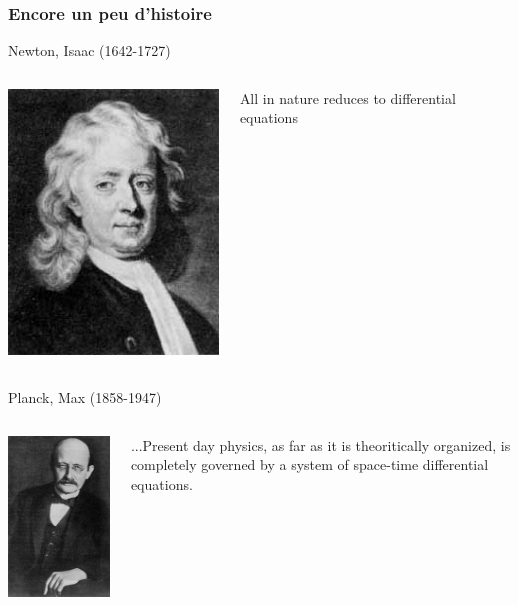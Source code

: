 \begin{frame}
  \frametitle{Encore un peu d'histoire}

  \begin{block}{Newton, Isaac (1642-1727) }
    \begin{columns}[c]
      \begin{column}{.3\textwidth}
        \includegraphics[height=.25\textheight]{Figures/photos/Newton}
      \end{column}
      \begin{column}{.55\textwidth}
        All in nature reduces to differential equations
      \end{column}
    \end{columns}

  \end{block}

  \begin{block}{Planck, Max (1858-1947)}
    \begin{columns}[c]
      \begin{column}{.3\textwidth}
        \includegraphics[height=.25\textheight]{Figures/photos/Planck}
      \end{column}
      \begin{column}{.55\textwidth}
        ...Present day physics, as far as it is theoritically organized,
        is completely governed by a system of space-time differential
        equations.
      \end{column}
    \end{columns}
  \end{block}
 \end{frame}
